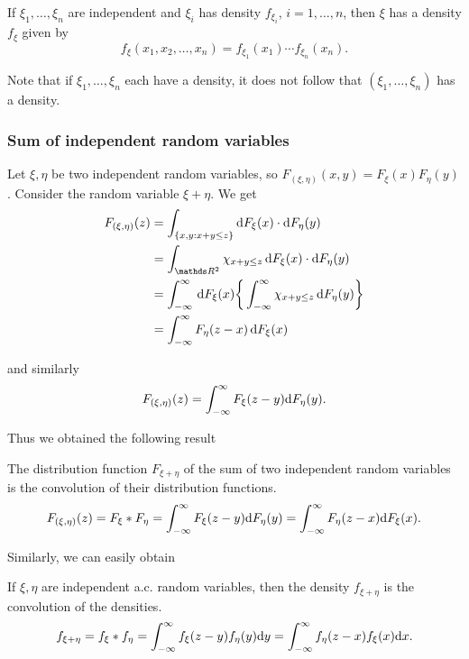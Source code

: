 \begin{corollary}
If $\xi_1,\dots, \xi_n$ are independent and $\xi_i$ has density $f_{\xi_i}$, $i = 1,\dots, n$, then $\xi$ has a density $f_\xi$ given by
\begin{equation*}
    f_\xi(x_1, x_2, \dots, x_n) = f_{\xi_1}(x_1)\cdots f_{\xi_n}(x_n).
\end{equation*}
\end{corollary}

\begin{remark}
Note that if $\xi_1,\dots, \xi_n$ each have a density, it does not follow that $(\xi_1,\dots, \xi_n)$ has a density.
\end{remark}

\subsubsection{Sum of independent random variables}
Let $\xi, \eta$ be two independent random variables, so $F_{(\xi,\eta)} (x,y)= F_\xi(x) F_\eta(y)$. Consider the random variable $\xi + \eta$. We get
\begin{align*}
    F_{(\xi,\eta)}(z) &= \int_{\{x,y:x+y \le z \}} \d F_\xi(x) \cdot \d F_\eta(y)\\
    &=\int_{\R^2}\chi_{x+y\le z} \, \d F_\xi(x) \cdot \d F_\eta(y)\\
    &=\int_{-\infty}^\infty \, \d F_\xi(x) \bigg\{ \int_{-\infty}^\infty \chi_{x+y \le z} \, \d F_\eta(y) \bigg\}\\
    &=\int_{-\infty}^\infty F_{\eta}(z-x) \, \d F_\xi(x)
\end{align*}

and similarly 
\begin{equation*}
    F_{(\xi,\eta)}(z) = \int_{-\infty}^\infty F_{\xi}(z-y) \mathrm{d} F_\eta(y).
\end{equation*}

Thus we obtained the following result
\begin{proposition}
The distribution function $F_{\xi + \eta}$ of the sum of two independent random variables is the convolution of their distribution functions. 
\begin{equation}
    F_{(\xi,\eta)}(z) = F_\xi * F_\eta = \int_{-\infty}^\infty F_{\xi}(z-y) \mathrm{d} F_\eta(y) = \int_{-\infty}^\infty F_{\eta}(z-x) \mathrm{d} F_\xi(x).
\end{equation}
\end{proposition}

Similarly, we can easily obtain
\begin{corollary}
If $\xi, \eta$ are independent a.c. random variables, then the density $f_{\xi + \eta}$ is the convolution of the densities.
\begin{equation}
    f_{\xi + \eta} = f_\xi * f_\eta = \int_{-\infty}^\infty f_{\xi}(z-y) f_\eta(y) \mathrm{d} y = \int_{-\infty}^\infty f_{\eta}(z-x) f_\xi(x)\mathrm{d} x.
\end{equation}
\end{corollary}


